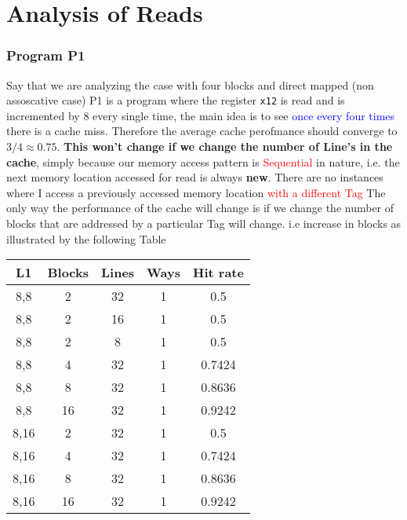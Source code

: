 \section{Analysis of Reads}
\subsubsection{Program P1}
Say that we are analyzing the case with four blocks and direct mapped (non assoscative case)
P1 is a program where the register \verb |x12| is read and is incremented by 8 every single time, 
the main idea is to see \textcolor{blue}{once every four times} there is a cache miss. Therefore the average cache perofmance 
should converge to $3/4 \approx 0.75$. \textbf{This won't change if we change the number of Line's in the cache}, simply because our memory
access pattern is \textcolor{red}{Sequential} in nature, i.e. the next memory location accessed for read is always \textbf{new}.
There are no instances where I access a previously accessed memory location \textcolor{red}{with a different Tag} The only way the performance of the 
cache will change is if we change the number of blocks that are addressed by a particular Tag will change. i.e increase in blocks as illustrated by the following Table
\\
\begin{center}
\begin{tabular}{c | c | c | c | c}
L1 & Blocks & Lines & Ways &  Hit rate\\
\hline
8,8 & 2 & 32 & 1 & 0.5\\
\hline
8,8 & 2 & 16 & 1 & 0.5\\
\hline
8,8 & 2 & 8 & 1 & 0.5\\
\hline
8,8 & 4 & 32 & 1 & 0.7424\\
\hline
8,8 & 8 & 32 & 1 & 0.8636\\
\hline
8,8 & 16 & 32 & 1 & 0.9242\\
\hline
8,16 &  2 & 32 & 1 & 0.5\\
\hline
8,16 & 4 & 32 & 1 & 0.7424\\
\hline
8,16 & 8 & 32 & 1 & 0.8636\\
\hline
8,16 & 16 & 32 & 1 & 0.9242\\
\hline
\end{tabular}
\end{center}
